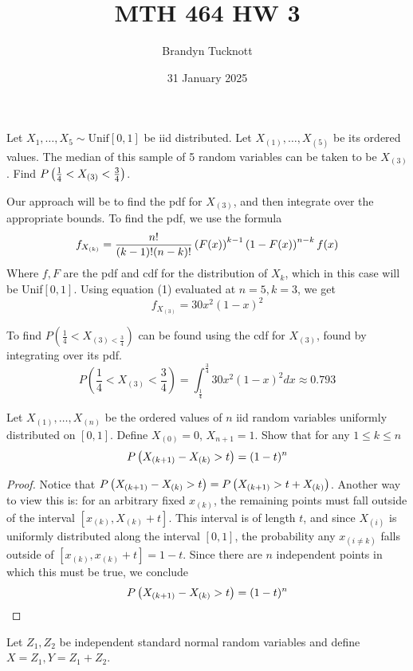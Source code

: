 \documentclass{exam}
\title{MTH 464 HW 3}
\author{Brandyn Tucknott}
\date{31 January 2025}
\begin{document}
\maketitle

\begin{questions}
    \question
Let $X_1, \hdots, X_5\sim \text{Unif}[0, 1]$ be iid distributed. Let $X_{(1)}, \hdots, X_{(5)}$ be its ordered values. The median of this sample of 5 random variables can be taken to be $X_{(3)}$. Find $P\left( \frac{1}{4} < X_{(3)} < \frac{3}{4} \right)$.

\sol
Our approach will be to find the pdf for $X_{(3)}$, and then integrate over the appropriate bounds. To find the pdf, we use the formula
\begin{equation}
f_{X_{(k)}} = \frac{n!}{(k - 1)!(n - k)!}\left( F(x) \right)^{k - 1}\left( 1 - F(x) \right)^{n - k} f(x)
\end{equation}
Where $f, F$ are the pdf and cdf for the distribution of $X_k$, which in this case will be Unif$[0, 1]$. Using equation (1) evaluated at $n = 5, k = 3$, we get
$$f_{X_{(3)}} = 30x^2(1 - x)^2$$

To find $P(\frac{1}{4} < X_{(3) < \frac{3}{4}})$ can be found using the cdf for $X_{(3)}$, found by integrating over its pdf.
$$P(\frac{1}{4} < X_{(3)} < \frac{3}{4}) = \int_\frac{1}{4}^\frac{3}{4} 30x^2(1 - x)^2 dx \approx 0.793$$

\newpage
\question
Let $X_{(1)}, \hdots, X_{(n)}$ be the ordered values of $n$ iid random variables uniformly distributed on $[0, 1]$. Define $X_{(0)} = 0$, $X_{n + 1} = 1$. Show that for any $1 \leq k \leq n$
$$P\left( X_{(k + 1)} - X_{(k)} > t \right) = (1 - t)^n$$

\begin{proof}
    Notice that $P\left( X_{(k + 1)} - X_{(k)} > t \right) = P\left( X_{(k + 1)} > t + X_{(k)} \right)$. Another way to view this is: for an arbitrary fixed $x_{(k)}$, the remaining points must fall outside of the interval $[x_{(k)}, X_{(k)} + t]$. This interval is of length $t$, and since $X_{(i)}$ is uniformly distributed along the interval $[0, 1]$, the probability any $x_{(i \neq k)}$ falls outside of $[x_{(k)}, x_{(k)} + t] = 1 - t$. Since there are $n$ independent points in which this must be true, we conclude
    $$P\left( X_{(k + 1)} - X_{(k)} > t \right) = (1 - t)^n$$
\end{proof}
\newpage
\question
Let $Z_1, Z_2$ be independent standard normal random variables and define $X = Z_1, Y = Z_1 + Z_2$.

\begin{parts}

\end{parts}
\end{questions}
\end{document}
